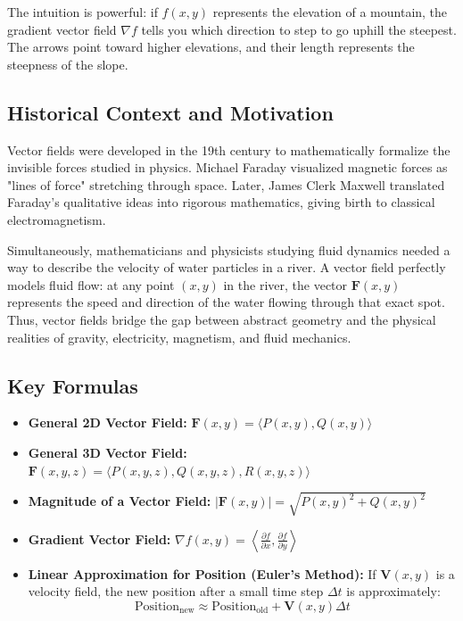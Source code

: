 \documentclass[11pt]{article}
\begin{document}
The intuition is powerful: if $f(x,y)$ represents the elevation of a mountain, the gradient vector field $\nabla f$ tells you which direction to step to go uphill the steepest. The arrows point toward higher elevations, and their length represents the steepness of the slope.

\subsection{Historical Context and Motivation}
Vector fields were developed in the 19th century to mathematically formalize the invisible forces studied in physics. Michael Faraday visualized magnetic forces as "lines of force" stretching through space. Later, James Clerk Maxwell translated Faraday's qualitative ideas into rigorous mathematics, giving birth to classical electromagnetism. 

Simultaneously, mathematicians and physicists studying fluid dynamics needed a way to describe the velocity of water particles in a river. A vector field perfectly models fluid flow: at any point $(x,y)$ in the river, the vector $\mathbf{F}(x,y)$ represents the speed and direction of the water flowing through that exact spot. Thus, vector fields bridge the gap between abstract geometry and the physical realities of gravity, electricity, magnetism, and fluid mechanics.

\subsection{Key Formulas}
\begin{itemize}
    \item \textbf{General 2D Vector Field:} $\mathbf{F}(x, y) = \langle P(x, y), Q(x, y) \rangle$
    \item \textbf{General 3D Vector Field:} $\mathbf{F}(x, y, z) = \langle P(x, y, z), Q(x, y, z), R(x, y, z) \rangle$
    \item \textbf{Magnitude of a Vector Field:} $|\mathbf{F}(x, y)| = \sqrt{P(x,y)^2 + Q(x,y)^2}$
    \item \textbf{Gradient Vector Field:} $\nabla f(x, y) = \left\langle \frac{\partial f}{\partial x}, \frac{\partial f}{\partial y} \right\rangle$
    \item \textbf{Linear Approximation for Position (Euler's Method):} If $\mathbf{V}(x,y)$ is a velocity field, the new position after a small time step $\Delta t$ is approximately:
    \[ \text{Position}_{\text{new}} \approx \text{Position}_{\text{old}} + \mathbf{V}(x, y) \Delta t \]
\end{itemize}
\end{document}
